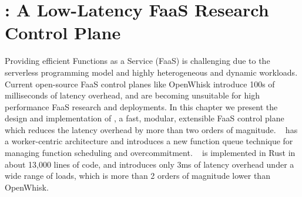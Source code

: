 \chapter{\sysname: A Low-Latency FaaS Research Control Plane}
\label{chap:iluvatar}

Providing efficient Functions as a Service (FaaS) is challenging due to the serverless programming model and highly heterogeneous and dynamic workloads. 
Current open-source FaaS control planes like OpenWhisk introduce 100s of milliseconds of latency overhead, and are becoming unsuitable for high performance FaaS research and deployments.
In this chapter we present the design and implementation of \sysname, a fast, modular, extensible FaaS control plane which reduces the latency overhead by more than two orders of magnitude.
\sysname~ has a worker-centric architecture and introduces a new function queue technique for managing function scheduling and overcommitment. 
\sysname~ is implemented in Rust in about 13,000 lines of code, and introduces only 3ms of latency overhead under a wide range of loads, which is more than 2 orders of magnitude lower than OpenWhisk. 













